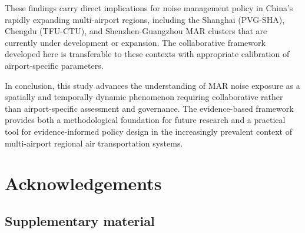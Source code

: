 \documentclass[review,12pt]{elsarticle}
\begin{document}
These findings carry direct implications for noise management policy in China's rapidly expanding multi-airport regions, including the Shanghai (PVG-SHA), Chengdu (TFU-CTU), and Shenzhen-Guangzhou MAR clusters that are currently under development or expansion. The collaborative framework developed here is transferable to these contexts with appropriate calibration of airport-specific parameters.

In conclusion, this study advances the understanding of MAR noise exposure as a spatially and temporally dynamic phenomenon requiring collaborative rather than airport-specific assessment and governance. The evidence-based framework provides both a methodological foundation for future research and a practical tool for evidence-informed policy design in the increasingly prevalent context of multi-airport regional air transportation systems.

\section*{Acknowledgements}





\begin{appendix}
\section{Supplementary material}
\end{appendix}
\end{document}
